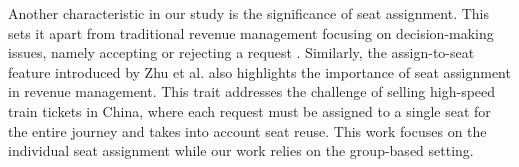 Another characteristic in our study is the significance of seat assignment. This sets it apart from traditional revenue management focusing on decision-making issues, namely accepting or rejecting a request \cite{gallego1997multiproduct}. Similarly, the assign-to-seat feature introduced by Zhu et al. \cite{zhu2023assign} also highlights the importance of seat assignment in revenue management. This trait addresses the challenge of selling high-speed train tickets in China, where each request must be assigned to a single seat for the entire journey and takes into account seat reuse. This work focuses on the individual seat assignment while our work relies on the group-based setting.















